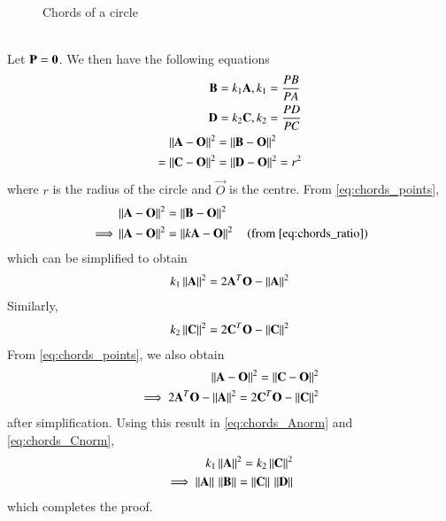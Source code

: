 \begin{enumerate}[label=\arabic*.,ref=\thesubsection.\theenumi]
\begin{figure}[!ht]
\begin{center}
		\resizebox{\columnwidth}{!}{}
	\end{center}
	\caption{Chords of a circle}
	\label{fig:chords}	
\end{figure}
\\
\solution Let $\mathbf{P} = \mathbf{0}$.  We then have the following equations
\begin{align}
\begin{split}
\mathbf{B} &= k_1 \mathbf{A}, k_1 = \frac{PB}{PA}
\\
\mathbf{D} &= k_2 \mathbf{C}, k_2 = \frac{PD}{PC}
\end{split}
\label{eq:chords_ratio}
\\
\begin{split}
\left\lVert\mathbf{A}-\mathbf{O}\right\rVert^2 &= \left\lVert\mathbf{B}-\mathbf{O}\right\rVert^2 
\\
= \left\lVert\mathbf{C}-\mathbf{O}\right\rVert^2 &= \left\lVert\mathbf{D}-\mathbf{O}\right\rVert^2 = r^2
\end{split}
\label{eq:chords_points}
\end{align}
%
where $r$ is the radius of the circle and $\vec{O}$ is the centre. From \eqref{eq:chords_points},
\begin{align}
&\left\lVert\mathbf{A}-\mathbf{O}\right\rVert^2 = \left\lVert\mathbf{B}-\mathbf{O}\right\rVert^2
\\
\implies &\left\lVert\mathbf{A}-\mathbf{O}\right\rVert^2 = \left\lVert k\mathbf{A}-\mathbf{O}\right\rVert^2 \quad(\text{from \eqref{eq:chords_ratio}})
\end{align}
%
which can be simplified to obtain
\begin{align}
k_1\left\lVert\mathbf{A}\right\rVert^2 = 2\mathbf{A}^T\mathbf{O}-\left\lVert\mathbf{A}\right\rVert^2
\label{eq:chords_Anorm}
\end{align}
Similarly,
\begin{align}
k_2\left\lVert\mathbf{C}\right\rVert^2 = 2\mathbf{C}^T\mathbf{O}-\left\lVert\mathbf{C}\right\rVert^2
\label{eq:chords_Cnorm}
\end{align}
%
From \eqref{eq:chords_points}, we also obtain
\begin{align}
\left\lVert\mathbf{A}-\mathbf{O}\right\rVert^2 
= \left\lVert\mathbf{C}-\mathbf{O}\right\rVert^2 
\\
\implies 2\mathbf{A}^T\mathbf{O}-\left\lVert\mathbf{A}\right\rVert^2 = 2\mathbf{C}^T\mathbf{O}-\left\lVert\mathbf{C}\right\rVert^2
\label{eq:chords_ACnorm}
\end{align}
%
after simplification. Using this result in \eqref{eq:chords_Anorm} and \eqref{eq:chords_Cnorm},
\begin{align}
k_1\left\lVert\mathbf{A}\right\rVert^2 = k_2\left\lVert\mathbf{C}\right\rVert^2
\\
\implies \left\lVert\mathbf{A}\right\rVert\, \left\lVert\mathbf{B}\right\rVert=\left\lVert\mathbf{C}\right\rVert\,\left\lVert\mathbf{D}\right\rVert
\end{align}
which completes the proof.


\end{enumerate}
